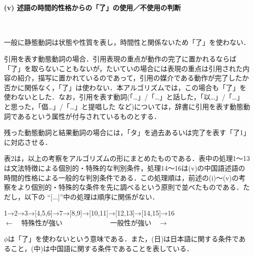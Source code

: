 \paragraph{(v) 述語の時間的性格からの「了」の使用／不使用の判断}　

\begin{enumerater}
\renewcommand{\labelenumi}{}
\renewcommand{\theenumi}{}
\item 一般に静態動詞は状態や性質を表し，時間性と関係ないため「了」を使わない．
\item 引用を表す動態動詞の場合．引用表現の重点が動作の完了に置かれるならば「了」を取らないこともないが，たいていの場合には表現の重点は引用された内容の紹介，描写に置かれているのであって，引用の媒介である動作が完了したか否かに関係なく，「了」は使わない\cite{Cho1985}．本アルゴリズムでは，この場合も「了」を使わないとした．なお，引用を表す動詞(「…」/「…」と話した，「以…」/「…」と思った，「倡…」/「…」と提唱した など)については，辞書に引用を表す動態動詞であるという属性が付与されているものとする．
\item 残った動態動詞と結果動詞の場合には，「タ」を過去あるいは完了を表す「了1」に対応させる．\\
\end{enumerater}

表2は，以上の考察をアルゴリズムの形にまとめたものである．表中の処理1〜13は文法特徴による個別的・特殊的な判別条件，処理14〜16は(v)の中国語述語の時間的性格による一般的な判別条件である．この処理順は，前述の(i)〜(v)の考察をより個別的・特殊的な条件を先に調べるという原則で並べたものである．ただし，以下の ``[...]''中の処理は順序に関係がない．
\begin{center}
1→2→3→[4,5,6]→7→[8,9]→[10,11]→[12,13]→[14,15]→16\\
$\longleftarrow$　特殊性が強い　　　　　　　一般性が強い　$\longrightarrow$
\end{center}
$\phi$は「了」を使わないという意味である．また，(日)は日本語に関する条件であること，(中)は中国語に関する条件であることを表している．


